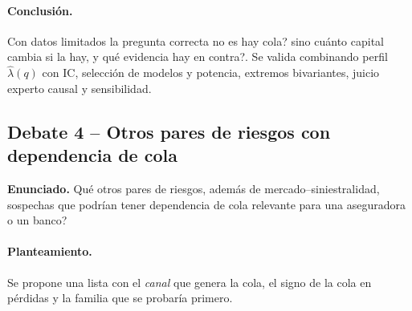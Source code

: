\documentclass[a4paper,12pt]{article}
\begin{document}
\paragraph{Conclusión.} Con datos limitados la pregunta correcta no es \guillemotleft{}\textquestiondown{}hay cola?\guillemotright{} sino \guillemotleft{}\textquestiondown{}cuánto capital cambia si la hay, y qué evidencia hay en contra?\guillemotright{}. Se valida combinando perfil $\hat\lambda(q)$ con IC, selección de modelos y potencia, extremos bivariantes, juicio experto causal y sensibilidad.

\subsection{Debate 4 -- Otros pares de riesgos con dependencia de cola}

\noindent\textbf{Enunciado.} \textquestiondown{}Qué otros pares de riesgos, además de mercado--siniestralidad, sospechas que podrían tener dependencia de cola relevante para una aseguradora o un banco?

\paragraph{Planteamiento.} Se propone una lista con el \emph{canal} que genera la cola, el signo de la cola en pérdidas y la familia que se probaría primero.
\end{document}
